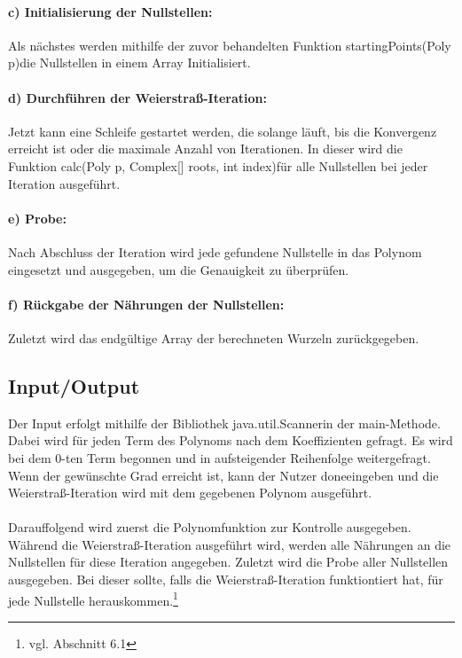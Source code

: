 \documentclass[12pt]{article}
\begin{document}
\paragraph{c) Initialisierung der Nullstellen:}
Als nächstes werden mithilfe der zuvor behandelten Funktion \glqq startingPoints(Poly p)\grqq\space die Nullstellen in einem Array Initialisiert.

\paragraph{d) Durchführen der Weierstraß-Iteration:}
Jetzt kann eine Schleife gestartet werden, die solange läuft, bis die Konvergenz erreicht ist oder die maximale Anzahl von Iterationen. In dieser wird die Funktion \glqq calc(Poly p, Complex[] roots, int index)\grqq\space für alle Nullstellen bei jeder Iteration ausgeführt.

\paragraph{e) Probe:}
Nach Abschluss der Iteration wird jede gefundene Nullstelle in das Polynom eingesetzt und ausgegeben, um die Genauigkeit zu überprüfen.

\paragraph{f) Rückgabe der Nährungen der Nullstellen:}
Zuletzt wird das endgültige Array der berechneten Wurzeln zurückgegeben.

\subsection{Input/Output}
Der Input erfolgt mithilfe der Bibliothek \glqq java.util.Scanner\grqq\space in der \glqq main\grqq-Methode. Dabei wird für jeden Term des Polynoms nach dem Koeffizienten gefragt. Es wird bei dem $0$-ten Term begonnen und in aufsteigender Reihenfolge weitergefragt. Wenn der gewünschte Grad erreicht ist, kann der Nutzer \glqq done\grqq\space eingeben und die Weierstraß-Iteration wird mit dem gegebenen Polynom ausgeführt.\\
\\
Darauffolgend wird zuerst die Polynomfunktion zur Kontrolle ausgegeben. Während die Weierstraß-Iteration ausgeführt wird, werden alle Nährungen an die Nullstellen für diese Iteration angegeben. Zuletzt wird die Probe aller Nullstellen ausgegeben. Bei dieser sollte, falls die Weierstraß-Iteration funktiontiert hat, \grqq\space für jede Nullstelle herauskommen.\footnote{
    vgl. Abschnitt 6.1
}
\end{document}
